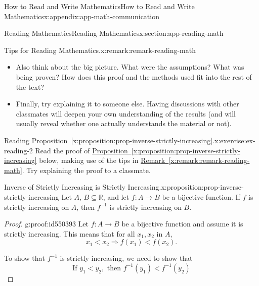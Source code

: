 \documentclass[oneside,10pt,]{book}
\newcommand{\xreffont}{\relax}
\numberwithin{equation}{section}
\newcommand{\lt}{<}
\begin{document}
\begin{appendixptx}{How to Read and Write Mathematics}{}{How to Read and Write Mathematics}{}{}{x:appendix:app-math-communication}
\begin{sectionptx}{Reading Mathematics}{}{Reading Mathematics}{}{}{x:section:app-reading-math}
\begin{remark}{Tips for Reading Mathematics.}{x:remark:remark-reading-math}
\begin{itemize}[label=\textbullet]
\begin{itemize}[label=$\circ$]
\item{}Can I simplify the idea to make it more understandable?%
\item{}Can I come up with my own examples based on this definition or property?%
\item{}Why did the author choose this way of explaining it?%
\item{}and so on\textellipsis{}%
\end{itemize}
%
\item{}Also think about the big picture. What were the assumptions? What was being proven? How does this proof and the methods used fit into the rest of the text?%
\item{}Finally, try explaining it to someone else. Having discussions with other classmates will deepen your own understanding of the results (and will usually reveal whether one actually understands the material or not).%
\end{itemize}
%
\end{remark}
\begin{inlineexercise}{Reading Proposition~{\xreffont\ref*{x:proposition:prop-inverse-strictly-increasing}}.}{x:exercise:ex-reading-2}%
Read the proof of \hyperref[x:proposition:prop-inverse-strictly-increasing]{Proposition~{\xreffont\ref{x:proposition:prop-inverse-strictly-increasing}}} below, making use of the tips in \hyperref[x:remark:remark-reading-math]{Remark~{\xreffont\ref{x:remark:remark-reading-math}}}. Try explaining the proof to a classmate.%
\end{inlineexercise}%
\begin{proposition}{Inverse of Strictly Increasing is Strictly Increasing.}{}{x:proposition:prop-inverse-strictly-increasing}%
Let \(A\), \(B \subseteq \mathbb{R}\), and let \(f:A \rightarrow B\) be a bijective function. If \(f\) is strictly increasing on \(A\), then \(f^{-1}\) is strictly increasing on \(B\).%
\end{proposition}
\begin{proof}{}{g:proof:id550393}
Let \(f: A \rightarrow B\) be a bijective function and assume it is strictly increasing. This means that for all \(x_1,x_2\) in \(A\),%
\begin{equation*}
x_1 \lt x_2 \Rightarrow f(x_1) \lt f(x_2)\text{.}
\end{equation*}
%
\par
 To show that \(f^{-1}\) is strictly increasing, we need to show that%
\begin{equation*}
\text{If } y_1 \lt y_2, \text{ then } f^{-1}(y_1) \lt f^{-1}(y_2)

\end{equation*}
\end{proof}
\end{sectionptx}
\end{appendixptx}
\end{document}
